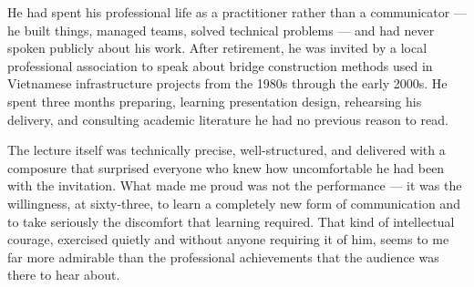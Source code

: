 \begin{ieltsanswer}
He had spent his professional life as a practitioner rather than a communicator — he built things, managed teams, solved technical problems — and had never spoken publicly about his work. After retirement, he was invited by a local professional association to speak about bridge construction methods used in Vietnamese infrastructure projects from the 1980s through the early 2000s. He spent three months preparing, learning presentation design, rehearsing his delivery, and consulting academic literature he had no previous reason to read.

The lecture itself was technically precise, well-structured, and delivered with a composure that surprised everyone who knew how uncomfortable he had been with the invitation. What made me proud was not the performance — it was the willingness, at sixty-three, to learn a completely new form of communication and to take seriously the discomfort that learning required. That kind of intellectual courage, exercised quietly and without anyone requiring it of him, seems to me far more admirable than the professional achievements that the audience was there to hear about.
\end{ieltsanswer}


